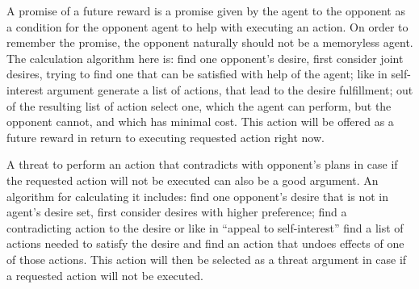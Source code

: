 A promise of a future reward is a promise given by the agent to the opponent as a condition for the opponent agent to help with executing an action. On order to remember the promise, the opponent naturally should not be a memoryless agent. The calculation algorithm here is: find one opponent's desire, first consider joint desires, trying to find one that can be satisfied with help of the agent; like in self-interest argument generate a list of actions, that lead to the desire fulfillment; out of the resulting list of action select one, which the agent can perform, but the opponent cannot, and which has minimal cost. This action will be offered as a future reward in return to executing requested action right now.

A threat to perform an action that contradicts with opponent's plans in case if the requested action will not be executed can also be a good argument. An algorithm for calculating it includes: find one opponent's desire that is not in agent's desire set, first consider desires with higher preference; find a contradicting action to the desire or like in ``appeal to self-interest'' find a list of actions needed to satisfy the desire and find an action that undoes effects of one of those actions. This action will then be selected as a threat argument in case if a requested action will not be executed.
